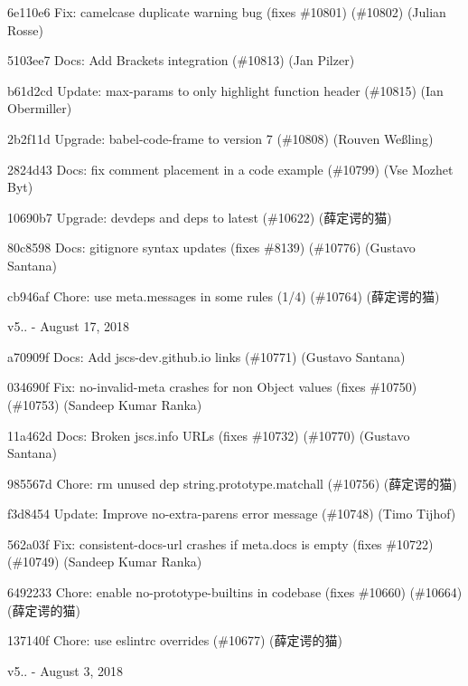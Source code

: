 \begin{DoxyItemize}
\item 6e110e6 Fix\+: camelcase duplicate warning bug (fixes \#10801) (\#10802) (Julian Rosse)
\item 5103ee7 Docs\+: Add Brackets integration (\#10813) (Jan Pilzer)
\item b61d2cd Update\+: max-\/params to only highlight function header (\#10815) (Ian Obermiller)
\item 2b2f11d Upgrade\+: babel-\/code-\/frame to version 7 (\#10808) (Rouven Weßling)
\item 2824d43 Docs\+: fix comment placement in a code example (\#10799) (Vse Mozhet Byt)
\item 10690b7 Upgrade\+: devdeps and deps to latest (\#10622) (薛定谔的猫)
\item 80c8598 Docs\+: gitignore syntax updates (fixes \#8139) (\#10776) (Gustavo Santana)
\item cb946af Chore\+: use meta.\+messages in some rules (1/4) (\#10764) (薛定谔的猫)
\end{DoxyItemize}

v5.. -\/ August 17, 2018


\begin{DoxyItemize}
\item a70909f Docs\+: Add jscs-\/dev.\+github.\+io links (\#10771) (Gustavo Santana)
\item 034690f Fix\+: no-\/invalid-\/meta crashes for non Object values (fixes \#10750) (\#10753) (Sandeep Kumar Ranka)
\item 11a462d Docs\+: Broken jscs.\+info URLs (fixes \#10732) (\#10770) (Gustavo Santana)
\item 985567d Chore\+: rm unused dep string.\+prototype.\+matchall (\#10756) (薛定谔的猫)
\item f3d8454 Update\+: Improve no-\/extra-\/parens error message (\#10748) (Timo Tijhof)
\item 562a03f Fix\+: consistent-\/docs-\/url crashes if meta.\+docs is empty (fixes \#10722) (\#10749) (Sandeep Kumar Ranka)
\item 6492233 Chore\+: enable no-\/prototype-\/builtins in codebase (fixes \#10660) (\#10664) (薛定谔的猫)
\item 137140f Chore\+: use eslintrc overrides (\#10677) (薛定谔的猫)
\end{DoxyItemize}

v5.. -\/ August 3, 2018


